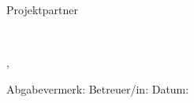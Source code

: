 \begin{titlepage}
{\begin{center}
\vfill\vfill\vfill\vfill
Projektpartner

\myprojectpartner\\

\vfill\vfill\vfill\vfill

\mysubmissiontown, \mysubmissionmonth~\mysubmissionyear

\vspace{0.5cm}
\hrulefill

\begin{flushleft}
	

\vfill\vfill
Abgabevermerk:    \hspace{5cm} 					Betreuer/in:
\vfill\vfill
Datum:       
\end{flushleft}
\end{center}
}%
\end{titlepage}